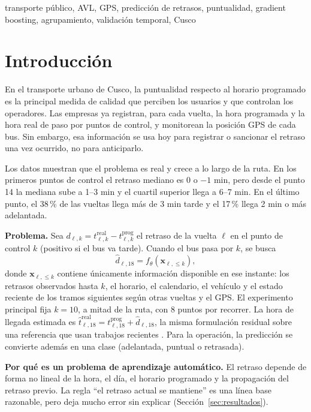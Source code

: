\documentclass[conference,spanish]{IEEEtran}
\begin{document}
\begin{IEEEkeywords}
transporte público, AVL, GPS, predicción de retrasos, puntualidad, gradient boosting, agrupamiento, validación temporal, Cusco
\end{IEEEkeywords}

\section{Introducción}

En el transporte urbano de Cusco, la puntualidad respecto al horario programado es la principal medida de calidad que perciben los usuarios y que controlan los operadores. Las empresas ya registran, para cada vuelta, la hora programada y la hora real de paso por puntos de control, y monitorean la posición GPS de cada bus. Sin embargo, esa información se usa hoy para registrar o sancionar el retraso una vez ocurrido, no para anticiparlo.

Los datos muestran que el problema es real y crece a lo largo de la ruta. En los primeros puntos de control el retraso mediano es 0 o $-1$ min, pero desde el punto 14 la mediana sube a 1--3 min y el cuartil superior llega a 6--7 min. En el último punto, el 38\,\% de las vueltas llega más de 3 min tarde y el 17\,\% llega 2 min o más adelantada.

\textbf{Problema.} Sea $d_{\ell,k}=t^{\mathrm{real}}_{\ell,k}-t^{\mathrm{prog}}_{\ell,k}$ el retraso de la vuelta $\ell$ en el punto de control $k$ (positivo si el bus va tarde). Cuando el bus pasa por $k$, se busca
\begin{equation}
\hat d_{\ell,18}=f_\theta\!\left(\mathbf x_{\ell,\le k}\right),
\end{equation}
donde $\mathbf x_{\ell,\le k}$ contiene únicamente información disponible en ese instante: los retrasos observados hasta $k$, el horario, el calendario, el vehículo y el estado reciente de los tramos siguientes según otras vueltas y el GPS. El experimento principal fija $k=10$, a mitad de la ruta, con 8 puntos por recorrer. La hora de llegada estimada es $\hat t^{\mathrm{real}}_{\ell,18}=t^{\mathrm{prog}}_{\ell,18}+\hat d_{\ell,18}$, la misma formulación residual sobre una referencia que usan trabajos recientes \cite{li2024arrivalnet,hu2022deepreta}. Para la operación, la predicción se convierte además en una clase (adelantada, puntual o retrasada).

\textbf{Por qué es un problema de aprendizaje automático.} El retraso depende de forma no lineal de la hora, el día, el horario programado y la propagación del retraso previo. La regla ``el retraso actual se mantiene'' es una línea base razonable, pero deja mucho error sin explicar (Sección~\ref{sec:resultados}).
\end{document}
